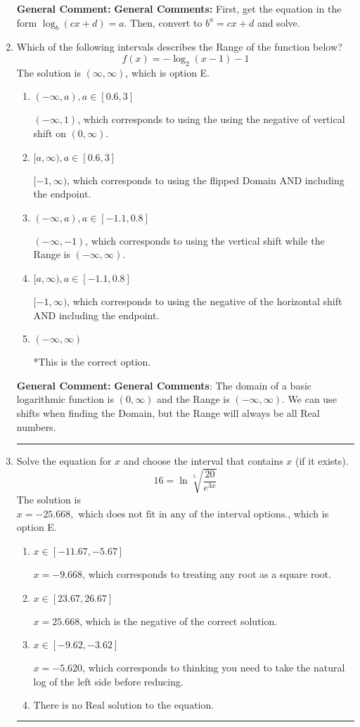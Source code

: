 \documentclass{extbook}[14pt]
\newcommand{\litem}[1]{\item #1

\rule{\textwidth}{0.4pt}}
\begin{document}
\begin{enumerate}
{\textbf{General Comment:} \textbf{General Comments:} First, get the equation in the form $\log_b{(cx+d)} = a$. Then, convert to $b^a = cx+d$ and solve.
}
\litem{
Which of the following intervals describes the Range of the function below?
\[ f(x) = -\log_2{(x-1)}-1 \]The solution is \( (\infty, \infty) \), which is option E.\begin{enumerate}[label=\Alph*.]
\item \( (-\infty, a), a \in [0.6, 3] \)

$(-\infty, 1)$, which corresponds to using the using the negative of vertical shift on $(0, \infty)$.
\item \( [a, \infty), a \in [0.6, 3] \)

$[-1, \infty)$, which corresponds to using the flipped Domain AND including the endpoint.
\item \( (-\infty, a), a \in [-1.1, 0.8] \)

$(-\infty, -1)$, which corresponds to using the vertical shift while the Range is $(-\infty, \infty)$.
\item \( [a, \infty), a \in [-1.1, 0.8] \)

$[-1, \infty)$, which corresponds to using the negative of the horizontal shift AND including the endpoint.
\item \( (-\infty, \infty) \)

*This is the correct option.
\end{enumerate}

\textbf{General Comment:} \textbf{General Comments}: The domain of a basic logarithmic function is $(0, \infty)$ and the Range is $(-\infty, \infty)$. We can use shifts when finding the Domain, but the Range will always be all Real numbers.
}
\litem{
 Solve the equation for $x$ and choose the interval that contains $x$ (if it exists).
\[  16 = \ln{\sqrt[5]{\frac{20}{e^{3x}}}} \]The solution is \( x = -25.668, \text{ which does not fit in any of the interval options.} \), which is option E.\begin{enumerate}[label=\Alph*.]
\item \( x \in [-11.67, -5.67] \)

$x = -9.668$, which corresponds to treating any root as a square root.
\item \( x \in [23.67, 26.67] \)

$x = 25.668$, which is the negative of the correct solution.
\item \( x \in [-9.62, -3.62] \)

$x = -5.620$, which corresponds to thinking you need to take the natural log of the left side before reducing.
\item \( \text{There is no Real solution to the equation.} \)


\end{enumerate}}
\end{enumerate}
\end{document}

